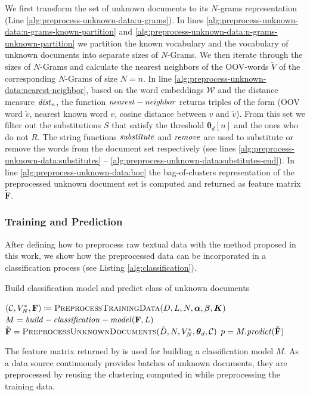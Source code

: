 We first transform the set of unknown documents to its $N$-grams representation
(Line \ref{alg:preprocess-unknown-data:n-grams}). In lines
\ref{alg:preprocess-unknown-data:n-grams-known-partition} and 
\ref{alg:preprocess-unknown-data:n-grams-unknown-partition} we partition the known
vocabulary and the vocabulary of unknown documents into separate sizes of $N$-Grams.
 We then iterate through the
sizes of $N$-Grams and calculate the nearest neighbors of the OOV-words
$\tilde{V}$ of the corresponding $N$-Grams of size $N=n$. In line
\ref{alg:preprocess-unknown-data:nearest-neighbor}, based on the word embeddings
$\mathcal{W}$ and the distance measure $\mathit{dist}_n$, the function $\mathit{nearest-neighbor}$ returns triples 
of the form (OOV word $\tilde{v}$, nearest known word $v$, cosine distance
between $v$ and $\tilde{v}$). 
From this set we filter out the substitutions $S$ that satisfy the
threshold $\boldsymbol \theta_d[n]$ and the ones who do not $R$. The
string functions $\mathit{substitute}$ and $\mathit{remove}$ are used to substitute or
remove the words from the document set respectively (see lines
\ref{alg:preprocess-unknown-data:substitutes} --
\ref{alg:preprocess-unknown-data:substitutes-end}). In line
\ref{alg:preprocess-unknown-data:boc} the bag-of-clusters
representation of the preprocessed unknown document set is computed and returned
as feature matrix $\mathbf{\tilde{F}}$.

\subsubsection{Training and Prediction}

After defining how to preprocess raw textual data with the method proposed in
this work, we show how the preprocessed data can be incorporated in a 
classification process (see Listing \ref{alg:classification}).

\begin{algorithm}
\label{alg:classification}
\caption{Build classification model and predict class of unknown documents}

\begin{algorithmic}[1]

\State $(\mathcal{C}, V_N^*, \mathbf{F}) \coloneqq
\textproc{PreprocessTrainingData}(D,L,N,\boldsymbol \alpha, \boldsymbol \beta, \boldsymbol K)$ \State $M = \mathit{build-classification-model}(\mathbf{F},L)$
\State $\mathbf{\tilde{F}} = \textproc{PreprocessUnknownDocuments}(\tilde{D}, N,
V_N^*, \boldsymbol\theta_d, \mathcal{C})$
\State $p = M.\mathit{predict}(\mathbf{\tilde{F}})$
\EndWhile

\EndFunction
\end{algorithmic}
\end{algorithm}

The feature matrix returned by  is used for
building a classification model $M$. As a data source continuously provides
batches of unknown documents, they are preprocessed by reusing the clustering
computed in while preprocessing the training data.
